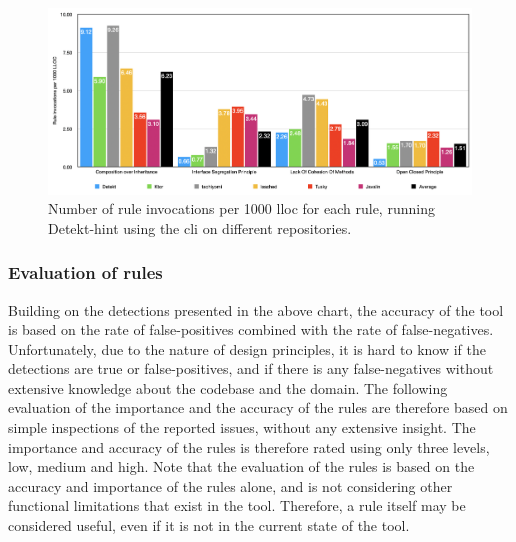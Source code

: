 \documentclass{report}
\begin{document}
\begin{figure}[h!]
    \centering
    \includegraphics[width=\linewidth]{images/distribution.png}
    \caption{Number of rule invocations per 1000 \gls{lloc} for each rule, running Detekt-hint using the \gls{cli} on different repositories.}
    \label{fig:distribution}
\end{figure}


\subsubsection{Evaluation of rules}
\label{rule-evaluation}
Building on the detections presented in the above chart, the accuracy of the tool is based on the rate of false-positives combined with the rate of false-negatives. Unfortunately, due to the nature of design principles, it is hard to know if the detections are true or false-positives, and if there is any false-negatives without extensive knowledge about the codebase and the domain. The following evaluation of the importance and the accuracy of the rules are therefore based on simple inspections of the reported issues, without any extensive insight. The importance and accuracy of the rules is therefore rated using only three levels, low, medium and high. Note that the evaluation of the rules is based on the accuracy and importance of the rules alone, and is not considering other functional limitations that exist in the tool. Therefore, a rule itself may be considered useful, even if it is not in the current state of the tool.
\end{document}
